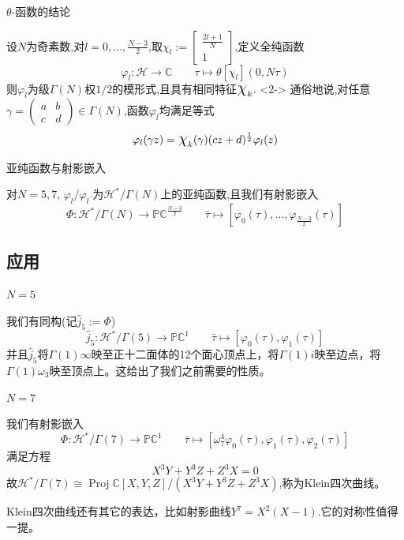 \documentclass[pdf]{beamer}
\numberwithin{equation}{section}
\theoremstyle{plain}
\theoremstyle{plain}
\theoremstyle{remark}
\DeclareMathOperator{\Proj}{\operatorname{Proj}}
\newcommand*{\bigchi}{\mbox{\Large$\chi$}}%
\newcommand{\character}[2]{\left[\begin{array}{c}{#1} \\ {#2}\end{array}\right]}
\begin{document}
\begin{frame}{$\theta$-函数的结论}
\begin{theorem}
	设$N$为奇素数,对$l=0,\ldots,\frac{N-3}{2}$,取$\chi_l:= \character{\frac{2l+1}{N}}{1}$,定义全纯函数
	$$\varphi_l: \mathcal{H} \longrightarrow \mathbb{C} \qquad \tau \longmapsto \theta[\chi_l](0,N\tau)$$
	则$\varphi_l$为级$\Gamma(N)$权$1/2$的模形式,且具有相同特征$\bigchi_k$.
	<2->
	通俗地说,对任意$\gamma=\begin{pmatrix}
	a & b\\c & d
	\end{pmatrix} \in \Gamma(N)$,函数$\varphi_l$均满足等式
	$$\varphi_l(\gamma z)= \bigchi_k(\gamma) (cz+d)^{\frac{1}{2}} \varphi_l(z)$$
\end{theorem}

\end{frame}
\begin{frame}{亚纯函数与射影嵌入}
\begin{theorem}
	对$N=5,7$, $\varphi_l/\varphi_{l^{\,'}}$为$\mathcal{H}^{*}/\Gamma(N)$上的亚纯函数,且我们有射影嵌入
$$\Phi: \mathcal{H}^*/\Gamma(N) \longrightarrow \mathbb{PC}^{\frac{N-3}{2}} \qquad \bar{\tau} \longmapsto \left[ \varphi_0(\tau),\ldots , \varphi_{\frac{N-3}{2}}(\tau) \right]$$
\end{theorem}
\end{frame}
\subsection{应用}
\begin{frame}{$N=5$}

	我们有同构(记$\hat{j}_5:=\varPhi$)
	$$\hat{j}_5: \mathcal{H}^*/\Gamma(5) \longrightarrow \mathbb{PC}^{1} \qquad \bar{\tau} \longmapsto \left[ \varphi_0(\tau),\varphi_{1}(\tau) \right]$$
并且$\hat{j}_5$将$\Gamma(1)\infty$映至正十二面体的12个面心顶点上，将$\Gamma(1)i$映至边点，将$\Gamma(1)\omega_3$映至顶点上。这给出了我们之前需要的性质。
\end{frame}
\begin{frame}{$N=7$}

	我们有射影嵌入
	$$\varPhi: \mathcal{H}^*/\Gamma(7) \longrightarrow \mathbb{PC}^{1} \qquad \bar{\tau} \longmapsto \left[ \omega_7^4\varphi_0(\tau),\varphi_{1}(\tau),\varphi_{2}(\tau) \right]$$
	满足方程
	$$X^3Y+Y^3Z+Z^3X=0$$
	故$\mathcal{H}^*/\Gamma(7) \cong \Proj\mathbb{C}[X,Y,Z]/(X^3Y+Y^3Z+Z^3X)$,称为Klein四次曲线。
	
	Klein四次曲线还有其它的表达，比如射影曲线$Y^7=X^2(X-1)$.它的对称性值得一提。
\end{frame}




\end{document}
